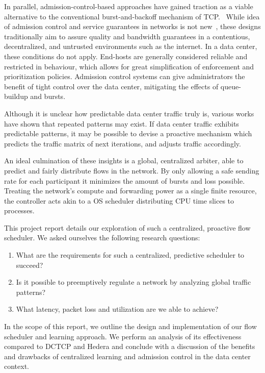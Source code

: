 In parallel, admission-control-based approaches have gained traction as a 
viable alternative to the conventional burst-and-backoff mechanism of 
TCP.~\cite{expresspass, fastpass, perc}
While idea of admission control and service guarantees in networks is not 
new~\cite{access_limit, access_limit2}, these designs traditionally 
aim to assure quality and bandwidth guarantees in a contentious, decentralized, 
and untrusted environments such as the internet. In a data center, these 
conditions do not apply. End-hosts are generally considered reliable and 
restricted in behaviour, which allows for great simplification of enforcement 
and prioritization policies. Admission control systems can give administrators 
the benefit of tight control over the data center, mitigating the effects of 
queue-buildup and bursts.

Although it is unclear how predictable data center traffic truly is, various 
works have shown that repeated patterns may 
exist.\cite{msr_dc,fb_dc,traffic,microte}
If data center traffic exhibits predictable patterns, it may be 
possible to devise a proactive mechanism which predicts the traffic matrix of 
next iterations, and adjusts traffic accordingly.


An ideal culmination of these insights is a global, 
centralized arbiter, able to predict and fairly distribute flows in the 
network. By only allowing a safe sending rate for each participant it minimizes 
the amount of bursts and loss possible.
Treating the network's compute and forwarding power as a single finite 
resource, the controller acts akin to a OS scheduler distributing CPU time 
slices to processes.

This project report details our exploration of such a centralized, 
proactive flow scheduler. We asked ourselves the following research questions:
\begin{enumerate}
    \item What are the requirements for such a centralized, predictive 
    scheduler to succeed?
    \item Is it possible to preemptively regulate a network by analyzing global 
    traffic patterns?
    \item What latency, packet loss and utilization are we able to achieve?
\end{enumerate}
In the scope of this report, we outline the design and implementation of our 
flow scheduler and learning approach. We perform an analysis of its 
effectiveness compared to DCTCP and Hedera and conclude with a discussion of 
the benefits and drawbacks of centralized learning and admission control in the 
data center context.
